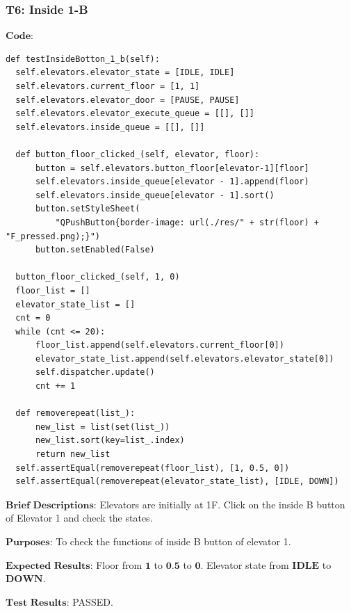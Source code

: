 \documentclass{article}
\begin{document}
\subsubsection*{T6: Inside 1-B}
$\textbf{Code:}$
\begin{lstlisting}
def testInsideBotton_1_b(self):
  self.elevators.elevator_state = [IDLE, IDLE]
  self.elevators.current_floor = [1, 1]
  self.elevators.elevator_door = [PAUSE, PAUSE]
  self.elevators.elevator_execute_queue = [[], []]
  self.elevators.inside_queue = [[], []]

  def button_floor_clicked_(self, elevator, floor):
      button = self.elevators.button_floor[elevator-1][floor]
      self.elevators.inside_queue[elevator - 1].append(floor)
      self.elevators.inside_queue[elevator - 1].sort()
      button.setStyleSheet(
          "QPushButton{border-image: url(./res/" + str(floor) + "F_pressed.png);}")
      button.setEnabled(False)

  button_floor_clicked_(self, 1, 0)
  floor_list = []
  elevator_state_list = []
  cnt = 0
  while (cnt <= 20):
      floor_list.append(self.elevators.current_floor[0])
      elevator_state_list.append(self.elevators.elevator_state[0])
      self.dispatcher.update()
      cnt += 1

  def removerepeat(list_):
      new_list = list(set(list_))
      new_list.sort(key=list_.index)
      return new_list
  self.assertEqual(removerepeat(floor_list), [1, 0.5, 0])
  self.assertEqual(removerepeat(elevator_state_list), [IDLE, DOWN])
\end{lstlisting}

$\textbf{Brief Descriptions:}$
Elevators are initially at 1F. Click on the inside B button of Elevator 1 and check the states.

$\textbf{Purposes:}$
To check the functions of inside B button of elevator 1.

$\textbf{Expected Results:}$
Floor from $\textbf{1}$ to $\textbf{0.5}$ to $\textbf{0}$. Elevator state from $\textbf{IDLE}$ to $\textbf{DOWN}$.

$\textbf{Test Results:}$
PASSED.
\end{document}
